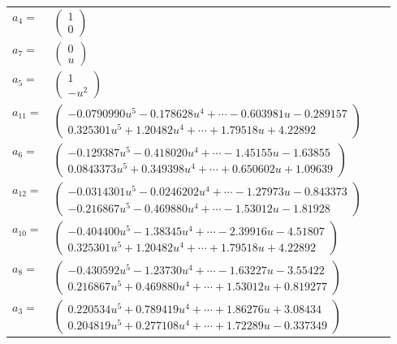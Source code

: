 \documentclass[1p]{elsarticle_modified}
\theoremstyle{definition}
\begin{document}
\begin{tabular}{m{7pt} m{180pt} m{7pt} m{180pt} }
\flushright $a_{4}=$&$\begin{pmatrix}1\\0\end{pmatrix}$ \\
\flushright $a_{7}=$&$\begin{pmatrix}0\\u\end{pmatrix}$ \\
\flushright $a_{5}=$&$\begin{pmatrix}1\\- u^2\end{pmatrix}$ \\
\flushright $a_{11}=$&$\begin{pmatrix}-0.0790990 u^{5}-0.178628 u^{4}+\cdots-0.603981 u-0.289157\\0.325301 u^{5}+1.20482 u^{4}+\cdots+1.79518 u+4.22892\end{pmatrix}$ \\
\flushright $a_{6}=$&$\begin{pmatrix}-0.129387 u^{5}-0.418020 u^{4}+\cdots-1.45155 u-1.63855\\0.0843373 u^{5}+0.349398 u^{4}+\cdots+0.650602 u+1.09639\end{pmatrix}$ \\
\flushright $a_{12}=$&$\begin{pmatrix}-0.0314301 u^{5}-0.0246202 u^{4}+\cdots-1.27973 u-0.843373\\-0.216867 u^{5}-0.469880 u^{4}+\cdots-1.53012 u-1.81928\end{pmatrix}$ \\
\flushright $a_{10}=$&$\begin{pmatrix}-0.404400 u^{5}-1.38345 u^{4}+\cdots-2.39916 u-4.51807\\0.325301 u^{5}+1.20482 u^{4}+\cdots+1.79518 u+4.22892\end{pmatrix}$ \\
\flushright $a_{8}=$&$\begin{pmatrix}-0.430592 u^{5}-1.23730 u^{4}+\cdots-1.63227 u-3.55422\\0.216867 u^{5}+0.469880 u^{4}+\cdots+1.53012 u+0.819277\end{pmatrix}$ \\
\flushright $a_{3}=$&$\begin{pmatrix}0.220534 u^{5}+0.789419 u^{4}+\cdots+1.86276 u+3.08434\\0.204819 u^{5}+0.277108 u^{4}+\cdots+1.72289 u-0.337349\end{pmatrix}$ \\

\end{tabular}
\end{document}
